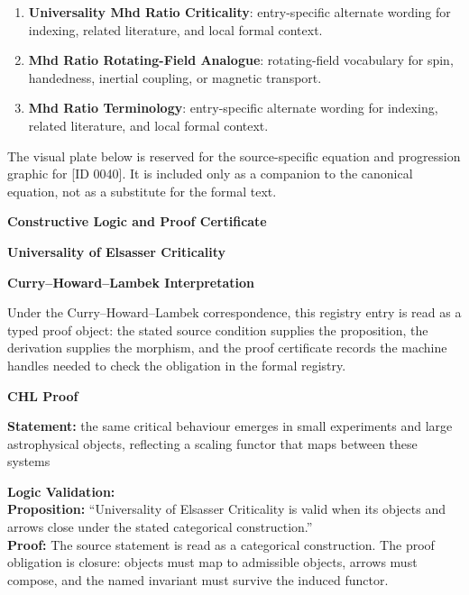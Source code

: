 \begingroup\footnotesize\sloppy
\begin{enumerate}[leftmargin=1.35em,itemsep=1pt,topsep=1pt,parsep=0pt]
\item \textbf{Universality Mhd Ratio Criticality}: entry-specific alternate wording for indexing, related literature, and local formal context.
\item \textbf{Mhd Ratio Rotating-Field Analogue}: rotating-field vocabulary for spin, handedness, inertial coupling, or magnetic transport.
\item \textbf{Mhd Ratio Terminology}: entry-specific alternate wording for indexing, related literature, and local formal context.
\end{enumerate}
\endgroup

\begingroup\footnotesize\sloppy
The visual plate below is reserved for the source-specific equation and progression graphic for [ID 0040]. It is included only as a companion to the canonical equation, not as a substitute for the formal text.
\par\endgroup
\ifTZPDarkEdition
{}
\fi

\clearpage
\begingroup\tzpsupportsetup
\noindent\textbf{\fontsize{10.8pt}{12.8pt}\selectfont [ID 0040] Constructive Logic and Proof Certificate}\par
\noindent\textbf{\fontsize{10pt}{12pt}\selectfont Universality of Elsasser Criticality}\par
\vspace{0.45em}
\begingroup
\footnotesize
\setlength{\parskip}{0.22em}
\setlength{\parindent}{0pt}
\noindent\textbf{Curry--Howard--Lambek Interpretation}\par
Under the Curry--Howard--Lambek correspondence, this registry entry is read as a typed proof
object: the stated source condition supplies the proposition, the derivation supplies the
morphism, and the proof certificate records the machine handles needed to check the obligation
in the formal registry.

\vspace{0.45em}
\noindent\textbf{CHL Proof}\par
\textbf{Statement:} the same critical behaviour emerges in small experiments and large astrophysical
objects, reflecting a scaling functor that maps between these systems

\textbf{Logic Validation:}\\
\textbf{Proposition:} ``Universality of Elsasser Criticality is valid when its objects and arrows close under
the stated categorical construction.''\\
\textbf{Proof:} The source statement is read as a categorical construction. The proof obligation is
closure: objects must map to admissible objects, arrows must compose, and the named
invariant must survive the induced functor.

